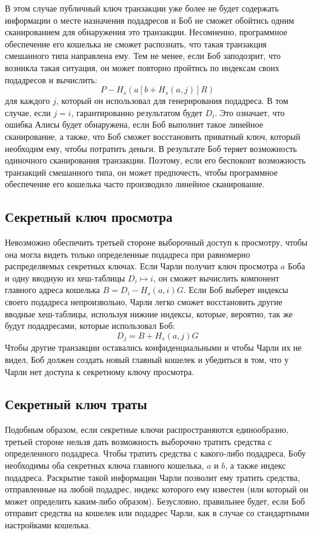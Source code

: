 \documentclass{mrl}
\begin{document}
В этом случае публичный ключ транзакции уже более не будет содержать информации о месте назначения подадресов и Боб не сможет обойтись одним сканированием для обнаружения это транзакции. Несомненно, программное обеспечение его кошелька не сможет распознать, что такая транзакция смешанного типа направлена ему. Тем не менее, если Боб заподозрит, что возникла такая ситуация, он может повторно пройтись по индексам своих подадресов и вычислить:
$$P - H_s(a[b+H_s(a,j)]R)$$
для каждого $j$, который он использовал для генерирования подадреса. В том случае, если $j = i$, гарантированно результатом будет $D_i$. Это означает, что ошибка Алисы будет обнаружена, если Боб выполнит такое линейное сканирование, а также, что Боб сможет восстановить приватный ключ, который необходим ему, чтобы потратить деньги. В результате Боб теряет возможность одиночного сканирования транзакции. Поэтому, если его беспокоит возможность транзакций смешанного типа, он может предпочесть, чтобы программное обеспечение его кошелька часто производило линейное сканирование.

\subsection{Секретный ключ просмотра}
Невозможно обеспечить третьей стороне выборочный доступ к просмотру, чтобы она могла видеть только определенные подадреса при равномерно распределяемых секретных ключах. Если Чарли получит ключ просмотра $a$ Боба и одну вводную из хеш-таблицы $D_i \mapsto i$, он сможет вычислить компонент главного адреса кошелька $B = D_i - H_s(a,i)G$. Если Боб выберет индексы своего подадреса непроизвольно, Чарли легко сможет восстановить другие вводные хеш-таблицы, используя нижние индексы, которые, вероятно, так же будут подадресами, которые использовал Боб:
$$D_j = B + H_s(a,j)G$$
Чтобы другие транзакции оставались конфиденциальными и чтобы Чарли их не видел, Боб должен создать новый главный кошелек и убедиться в том, что у Чарли нет доступа к секретному ключу просмотра.

\subsection{Секретный ключ траты}
Подобным образом, если секретные ключи распространяются единообразно, третьей стороне нельзя дать возможность выборочно тратить средства с определенного подадреса. Чтобы тратить средства с какого-либо подадреса, Бобу необходимы оба секретных ключа главного кошелька, $a$ и $b$, а также индекс подадреса. Раскрытие такой информации Чарли позволит ему тратить средства, отправленные на любой подадрес, индекс которого ему известен (или который он может определить каким-либо образом). Безусловно, правильнее будет, если Боб отправит средства на кошелек или подадрес Чарли, как в случае со стандартными настройками кошелька.
\end{document}
